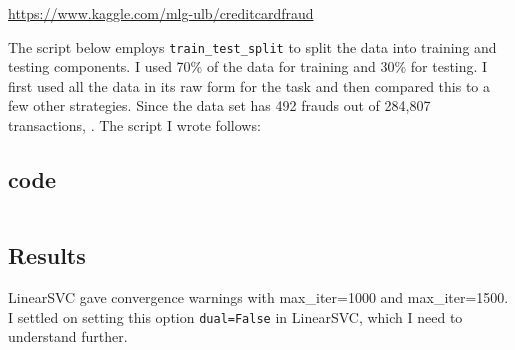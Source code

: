 \documentclass{article}
\newcommand{\mintedpython}[1]{\inputminted[frame=lines,framesep=2mm,baselinestretch=1.2,bgcolor=LightGray,fontsize=\footnotesize,linenos]{python}{#1}}
\begin{document}
\href{https://www.kaggle.com/mlg-ulb/creditcardfraud}{https://www.kaggle.com/mlg-ulb/creditcardfraud}

\bigskip
The script below employs \texttt{train{\_}test{\_}split} to split the data into training and testing components.  I used 70\% of the data for training and 30\% for testing.  I first used all the data in its raw form for the task and then compared this to a few other strategies.  Since the data set has 492 frauds out of 284,807 transactions, .  The script I wrote follows:

\subsection{code}
\mintedpython{Scikit-learn_credit_card_fraud/ml_credit_card_fraud.py}

\subsection{Results}
LinearSVC gave convergence warnings with max{\_}iter=1000 and max{\_}iter=1500.  I settled on setting this option \texttt{dual=False} in LinearSVC, which I need to understand further.
\end{document}
